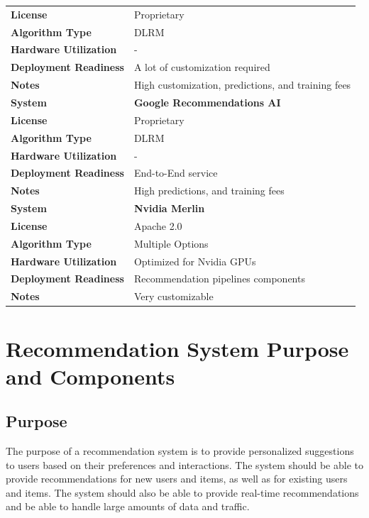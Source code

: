 \begin{table}[h]
\begin{tabular}{|l|l|}
        \cline{2-2}
        \textbf{License} & Proprietary \\
        \cline{2-2}
        \textbf{Algorithm Type} & DLRM \\
        \cline{2-2}
        \textbf{Hardware Utilization} & - \\
        \cline{2-2}
        \textbf{Deployment Readiness} & A lot of customization required  \\
        \cline{2-2}
        \textbf{Notes} & High customization, predictions, and training fees \\
        \hline
        \hline
        \textbf{System} & \textbf{Google Recommendations AI} \\
        \cline{2-2}
        \textbf{License} & Proprietary \\
        \cline{2-2}
        \textbf{Algorithm Type} & DLRM \\
        \cline{2-2}
        \textbf{Hardware Utilization} & - \\
        \cline{2-2}
        \textbf{Deployment Readiness} & End-to-End service \\
        \cline{2-2}
        \textbf{Notes} & High predictions, and training fees \\
        \hline
        \hline
        \textbf{System} & \textbf{Nvidia Merlin} \\
        \cline{2-2}
        \textbf{License} & Apache 2.0 \\
        \cline{2-2}
        \textbf{Algorithm Type} & Multiple Options  \\
        \cline{2-2}
        \textbf{Hardware Utilization} & Optimized for Nvidia GPUs \\
        \cline{2-2}
        \textbf{Deployment Readiness} & Recommendation pipelines components \\
        \cline{2-2}
        \textbf{Notes} & Very customizable \\
        \hline
    \end{tabular}
\end{table}
        
\section{Recommendation System Purpose and Components}
\subsection{Purpose}
The purpose of a recommendation system is to provide personalized suggestions to users based on their preferences and interactions. The system should be able to provide recommendations for new users and items, as well as for existing users and items. The system should also be able to provide real-time recommendations and be able to handle large amounts of data and traffic.
